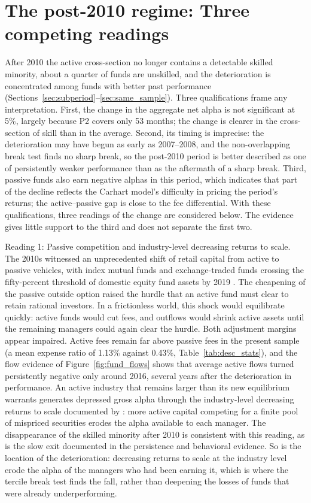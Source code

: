 \documentclass[12pt, oneside]{report}
\begin{document}
\section{The post-2010 regime: Three competing readings}
\label{sec:post_2011}

\noindent After 2010 the active cross-section no longer contains a
detectable skilled minority, about a quarter of funds are unskilled, and
the deterioration is concentrated among funds with better past
performance (Sections~\ref{sec:subperiod}--\ref{sec:same_sample}). Three
qualifications frame any interpretation. First, the change in the
aggregate net alpha is not significant at 5\%, largely because P2 covers
only 53 months; the change is clearer in the cross-section of skill than
in the average. Second, its timing is imprecise: the deterioration may
have begun as early as 2007--2008, and the non-overlapping break test
finds no sharp break, so the post-2010 period is better described as one
of persistently weaker performance than as the aftermath of a sharp
break. Third, passive funds also earn negative alphas in this period,
which indicates that part of the decline reflects the Carhart model's
difficulty in pricing the period's returns; the active--passive gap is
close to the fee differential. With these qualifications, three readings
of the change are considered below. The evidence gives little support to
the third and does not separate the first two.

Reading 1: Passive competition and industry-level decreasing returns to
scale. The 2010s witnessed an unprecedented shift of retail capital from
active to passive vehicles, with index mutual funds and exchange-traded
funds crossing the fifty-percent threshold of domestic equity fund
assets by 2019 \parencite{ICI2020}. The cheapening of the passive outside
option raised the hurdle that an active fund must clear to retain
rational investors. In a frictionless \textcite{BerkGreen2004} world,
this shock would equilibrate quickly: active funds would cut fees, and
outflows would shrink active assets until the remaining managers could
again clear the hurdle. Both adjustment margins appear impaired.
Active fees remain far above passive fees in the present sample (a mean
expense ratio of 1.13\% against 0.43\%, Table~\ref{tab:desc_stats}), and
the flow evidence of Figure~\ref{fig:fund_flows} shows that average active flows
turned persistently negative only around 2016, several years after the
deterioration in performance. An active industry that remains larger than
its new equilibrium warrants generates depressed gross alpha through the
industry-level decreasing returns to scale documented by
\textcite{PastorStambaughTaylor2015}: more active capital competing for a
finite pool of mispriced securities erodes the alpha available to each
manager. The disappearance of the skilled minority after 2010 is
consistent with this reading, as is the slow exit documented in the
persistence and behavioral evidence. So is the location of the
deterioration: decreasing returns to scale at the industry level erode
the alpha of the managers who had been earning it, which is where the
tercile break test finds the fall, rather than deepening the losses of
funds that were already underperforming.
\end{document}
